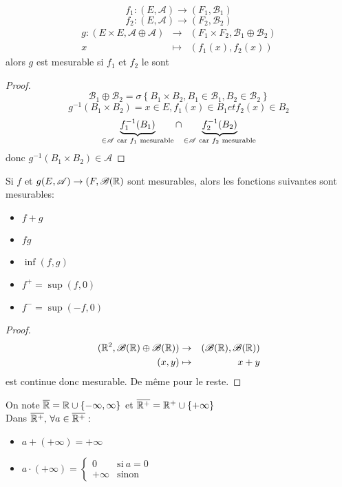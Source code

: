 \begin{prop}
	$$f_1 : (E,\mathscr{A}) \rightarrow (F_1,\mathscr{B_1})$$
	$$f_2 : (E,\mathscr{A}) \rightarrow (F_2,\mathscr{B_2})$$
	\begin{eqnarray*}
		g: (E \times E,\mathscr{A} \oplus \mathscr{A}) &\rightarrow& (F_1 \times F_2,\mathscr{B_1} \oplus \mathscr{B_2})\\
		x &\mapsto& (f_1(x), f_2(x))
	\end{eqnarray*}
	alors $g$ est mesurable si $f_1$ et $f_2$ le sont
\end{prop}

\begin{proof}
	$$\mathscr{B_1} \oplus \mathscr{B_2} = \sigma \left\{ B_1 \times B_2, B_1 \in \mathscr{B_1}, B_2 \in \mathscr{B_2} \right\}$$
	$$g^{-1}(B_1 \times B_2) = {x \in E, f_1(x) \in B_1 et f_2(x) \in B_2  }$$
	$$ \underbrace{f_1^{-1}(B_1)}_{\in \mathscr{A} \text{ car } f_1 \text{ mesurable}} \cap \underbrace{f_2^{-1}(B_2)}_{\in \mathscr{A} \text{ car } f_2 \text{ mesurable}}$$
	donc $g^{-1}(B_1 \times B_2) \in \mathscr{A}$
\end{proof}

\begin{prop}
	Si $f$ et $g (E,\mathscr{A}) \rightarrow (F,\mathscr{B}(\mathbb{R})$
	sont mesurables, alors les fonctions suivantes sont mesurables:
	\begin{itemize}
		\item $f + g$
		\item $fg$
		\item $\inf(f,g)$
		\item $f^+ = \sup(f,0)$
		\item $f^- = \sup(-f,0)$
	\end{itemize}
\end{prop}

\begin{proof}
	\begin{eqnarray*}
		(\mathbb{R}^2, \mathscr{B}(\mathbb{R}) \oplus \mathscr{B}(\mathbb{R}))   &\rightarrow& (\mathscr{B}(\mathbb{R}), \mathscr{B}(\mathbb{R})) \\
		(x,y) &\mapsto& x + y
	\end{eqnarray*}
	est continue donc mesurable. De même pour le reste.
\end{proof}


\begin{definition}
	On note $\overline{\mathbb{R}} = \mathbb{R} \cup \{ -\infty, \infty \}$ et $\overline{\mathbb{R}^+} = \mathbb{R}^+ \cup \{  +\infty \}$\\
	Dans $\overline{\mathbb{R}^+} , \, \forall a \in \overline{\mathbb{R}^+}: $
	\begin{itemize}
		\item $a + (+\infty) = +\infty$
		\item
		      $a \cdot (+\infty) = \left\{ \begin{array}{cc}
				      0       & \text{si} \  a = 0 \\
				      +\infty & \text{sinon}
			      \end{array}\right.$
	\end{itemize}
\end{definition}

